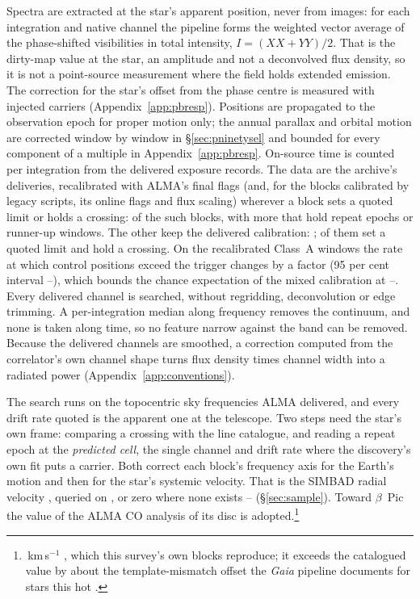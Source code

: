 Spectra are extracted at the star's apparent position, never from images: for
each integration and native channel the pipeline forms the weighted vector
average of the phase-shifted visibilities in total intensity,
$I=(XX+YY)/2$. That is the dirty-map value at the star, an amplitude and not a
deconvolved flux density, so it is not a point-source measurement where the
field holds extended emission. The correction for the star's offset from the
phase centre is measured with injected carriers (Appendix~\ref{app:pbresp}).
Positions are propagated to the observation epoch for proper motion only; the
annual parallax and orbital motion are corrected window by window in
\S\ref{sec:pninetysel} and bounded for every component of a multiple in
Appendix~\ref{app:pbresp}. On-source time is counted per integration from the
delivered exposure records.
%
The data are the archive's deliveries, recalibrated with ALMA's final flags
(and, for the \RflNEbLegacyWord{} blocks calibrated by legacy scripts, its online
flags and flux scaling) wherever a block sets a quoted limit or holds a
crossing: \RflNEbCore{} of the \RflNEbCoreAll{} such blocks, with
\RflNEbExtra{} more that hold repeat epochs or runner-up windows. The other
\RflNEbNot{} keep the delivered calibration: \RflNotClause; \RflNNotLim{} of
them set a quoted limit and
\RflNNotCross{} hold a crossing. On the \RflChNWin{} recalibrated Class~A
windows the rate at which control positions exceed the trigger changes by a
factor \RflChRatio{} (95 per cent interval \RflChLo--\RflChHi), which bounds the
chance expectation of the mixed calibration at \RflCeLo--\RflCeHi.
%
Every delivered channel is searched, without regridding, deconvolution or
edge trimming. A per-integration median along frequency removes the
continuum, and none is taken along time, so no feature narrow against the band
can be removed. Because the delivered channels are smoothed, a correction
computed from the correlator's own channel shape turns flux density times
channel width into a radiated power (Appendix~\ref{app:conventions}).

The search runs on the topocentric sky frequencies ALMA delivered, and every
drift rate quoted is the apparent one at the telescope. Two steps need the
star's own frame: comparing a crossing with the line catalogue, and reading a
repeat epoch at the \emph{predicted cell}, the single channel and drift rate
where the discovery's own fit puts a carrier. Both correct each block's
frequency axis for the Earth's motion and then for the star's systemic
velocity. That is the SIMBAD radial velocity \citep{SIMBAD2000}, queried on
\SimbadQueryDate, or zero where none exists -- \FrZeroVsysClause{}
(\S\ref{sec:sample}). Toward $\beta$~Pic the value of the ALMA CO analysis of
its disc is adopted.\footnote{\BpRecVsys\,km\,s$^{-1}$ \citep{Matra2017},
which this survey's own blocks reproduce; it exceeds the catalogued value by
about the template-mismatch offset the \textit{Gaia} pipeline documents for
stars this hot \citep{Blomme2023}.}

